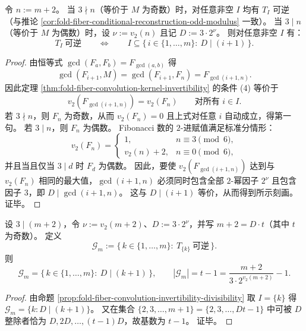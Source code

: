 \begin{proposition}[偶模长下的整除刻画]\label{prop:fold-fiber-convolution-invertibility-divisibility}
令 \(n:=m+2\)。
当 \(3\nmid n\)（等价于 \(M\) 为奇数）时，对任意非空 \(I\) 均有 \(T_I\) 可逆（与推论 \ref{cor:fold-fiber-conditional-reconstruction-odd-modulus} 一致）。
当 \(3\mid n\)（等价于 \(M\) 为偶数）时，设 \(\nu:=v_2(n)\) 且记 \(D:=3\cdot 2^{\nu}\)。
则对任意非空 \(I\) 有：
\[
T_I\ \text{可逆}\qquad\Longleftrightarrow\qquad
I\subseteq \{\,i\in\{1,\dots,m\}:\ D\mid (i+1)\,\}.
\]
\end{proposition}
\begin{proof}
由恒等式 \(\gcd(F_a,F_b)=F_{\gcd(a,b)}\) 得
\[
\gcd(F_{i+1},M)=\gcd(F_{i+1},F_n)=F_{\gcd(i+1,n)}.
\]
因此定理 \ref{thm:fold-fiber-convolution-kernel-invertibility} 的条件 (4) 等价于
\[
v_2(F_{\gcd(i+1,n)})=v_2(F_n)\qquad\text{对所有 }i\in I.
\]
若 \(3\nmid n\)，则 \(F_n\) 为奇数，从而 \(v_2(F_n)=0\) 且上式对任意 \(i\) 自动成立，得第一句。
若 \(3\mid n\)，则 \(F_n\) 为偶数。
Fibonacci 数的 \(2\)-进赋值满足标准分情形：
\[
v_2(F_n)=
\begin{cases}
1, & n\equiv 3\pmod 6,\\
v_2(n)+2, & n\equiv 0\pmod 6,
\end{cases}
\]
并且当且仅当 \(3\mid d\) 时 \(F_d\) 为偶数。
因此，要使 \(v_2(F_{\gcd(i+1,n)})\) 达到与 \(v_2(F_n)\) 相同的最大值，\(\gcd(i+1,n)\) 必须同时包含全部 \(2\)-幂因子 \(2^\nu\) 且包含因子 \(3\)，即 \(D\mid \gcd(i+1,n)\)。
这与 \(D\mid(i+1)\) 等价，从而得到所示刻画。
证毕。
\end{proof}

\begin{corollary}[可逆坐标集合的稀疏律与精确计数]\label{cor:fold-fiber-invertible-coordinate-sparsity}
设 \(3\mid (m+2)\)，令 \(\nu:=v_2(m+2)\)、\(D:=3\cdot 2^\nu\)，并写 \(m+2=D\cdot t\)（其中 \(t\) 为奇数）。
定义
\[
\mathcal G_m:=\{\,k\in\{1,\dots,m\}:\ T_{\{k\}}\ \text{可逆}\,\}.
\]
则
\[
\mathcal G_m=\{\,k\in\{1,\dots,m\}:\ D\mid (k+1)\,\},
\qquad
|\mathcal G_m|=t-1=\frac{m+2}{3\cdot 2^{v_2(m+2)}}-1.
\]
\end{corollary}
\begin{proof}
由命题 \ref{prop:fold-fiber-convolution-invertibility-divisibility} 取 \(I=\{k\}\) 得 \(\mathcal G_m=\{k:D\mid(k+1)\}\)。
又在集合 \(\{2,3,\dots,m+1\}=\{2,3,\dots,Dt-1\}\) 中可被 \(D\) 整除者恰为 \(D,2D,\dots,(t-1)D\)，故基数为 \(t-1\)。
证毕。
\end{proof}

